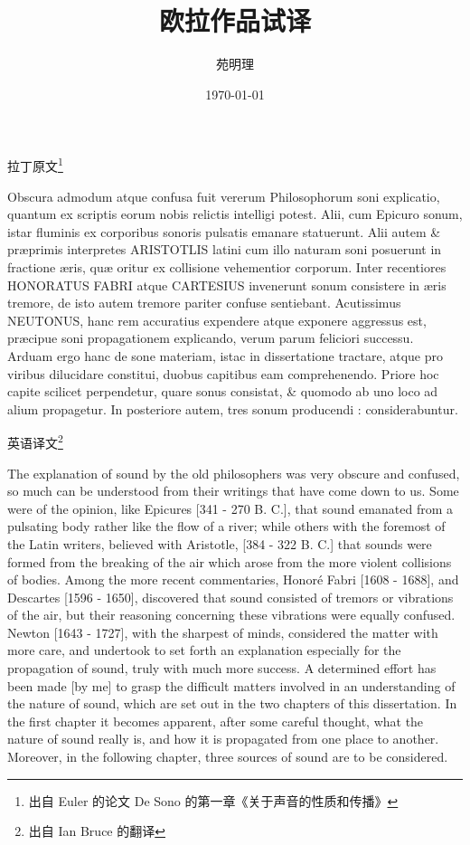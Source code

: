 \documentclass[a4paper,12pt]{article}
\title{欧拉作品试译}
\date{\nianyueri\today}
\author{苑明理}
\numberwithin{problem}{section}
\numberwithin{definition}{section}
\numberwithin{lemma}{section}
\numberwithin{proposition}{section}
\numberwithin{theorem}{section}
\numberwithin{grammar}{section}
\numberwithin{program}{section}
\numberwithin{convention}{section}
\numberwithin{corollary}{section}
\begin{document}
\begingroup
\let\newpage\relax
\maketitle
\endgroup

拉丁原文\footnote{出自 Euler 的论文 De Sono 的第一章《关于声音的性质和传播》}
\begin{displayquote}
Obscura admodum atque confusa fuit vererum Philosophorum soni explicatio,
quantum ex scriptis eorum nobis relictis intelligi potest. Alii, cum Epicuro sonum,
istar fluminis ex corporibus sonoris pulsatis emanare statuerunt.
Alii autem \& præprimis interpretes ARISTOTLIS latini cum illo naturam soni posuerunt in fractione æris,
quæ oritur ex collisione vehementior corporum. Inter recentiores HONORATUS FABRI atque CARTESIUS invenerunt sonum
consistere in æris tremore, de isto autem tremore pariter confuse sentiebant. Acutissimus NEUTONUS,
hanc rem accuratius expendere atque exponere aggressus est, præcipue soni propagationem explicando,
verum parum feliciori successu. Arduam ergo hanc de sone materiam, istac in dissertatione tractare,
atque pro viribus dilucidare constitui, duobus capitibus eam comprehenendo.
Priore hoc capite scilicet perpendetur, quare sonus consistat, \& quomodo ab uno loco ad alium propagetur.
In posteriore autem, tres sonum producendi : considerabuntur.
\end{displayquote}

英语译文\footnote{出自 Ian Bruce 的翻译}
\begin{displayquote}
The explanation of sound by the old philosophers was very obscure and confused, so much can be understood from their
writings that have come down to us. Some were of the opinion, like Epicures [341 - 270 B. C.], that sound emanated from
a pulsating body rather like the flow of a river; while others with the foremost of the Latin writers, believed with
Aristotle, [384 - 322 B. C.] that sounds were formed from the breaking of the air which arose from the more violent
collisions of bodies. Among the more recent commentaries, Honoré Fabri [1608 - 1688], and Descartes [1596 - 1650],
discovered that sound consisted of tremors or vibrations of the air, but their reasoning concerning these vibrations
were equally confused. Newton [1643 - 1727], with the sharpest of minds, considered the matter with more care,
and undertook to set forth an explanation especially for the propagation of sound, truly with much more success.
A determined effort has been made [by me] to grasp the difficult matters involved in an understanding of the nature of
sound, which are set out in the two chapters of this dissertation. In the first chapter it becomes apparent, after some
careful thought, what the nature of sound really is, and how it is propagated from one place to another. Moreover,
in the following chapter, three sources of sound are to be considered.
\end{displayquote}
\end{document}

